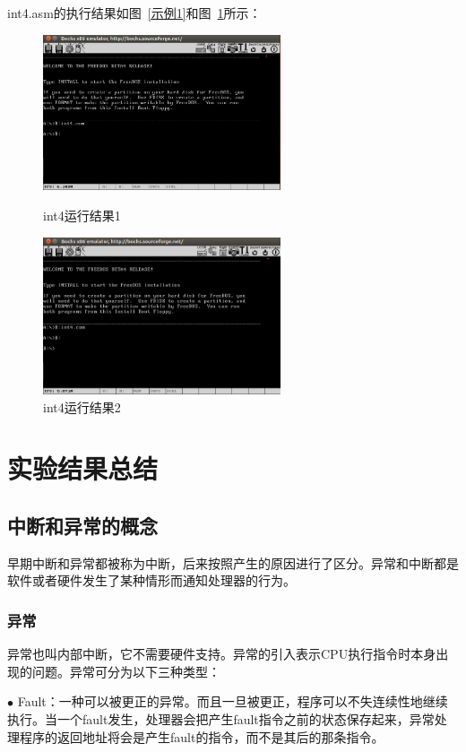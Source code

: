 \documentclass[UTF8,12pt]{ctexart}
\begin{document}
    int4.asm的执行结果如图~\ref{示例1}和图~\ref{示例2}所示：
    \begin{figure}[H]
        \centering
        \begin{minipage}[t]{0.5\textwidth}
        \centering
        \includegraphics[width=7cm]{images/int4结果1.png}
        \caption{int4运行结果1}
        \label{示例1}
        \end{minipage}
        \begin{minipage}[t]{0.49\textwidth}
        \centering
        \includegraphics[width=7cm]{images/int4结果2.png}
        \caption{int4运行结果2}
        \label{示例2}
        \end{minipage}
    \end{figure}
    
    
    \section{实验结果总结}
    \subsection{中断和异常的概念}
    早期中断和异常都被称为中断，后来按照产生的原因进行了区分。异常和中断都是软件或者硬件发生了某种情形而通知处理器的行为。
    \subsubsection{异常}
    异常也叫内部中断，它不需要硬件支持。异常的引入表示CPU执行指令时本身出现的问题。异常可分为以下三种类型：
    
    $\bullet$ Fault：一种可以被更正的异常。而且一旦被更正，程序可以不失连续性地继续执行。当一个fault发生，处理器会把产生fault指令之前的状态保存起来，异常处理程序的返回地址将会是产生fault的指令，而不是其后的那条指令。
    
\end{document}
